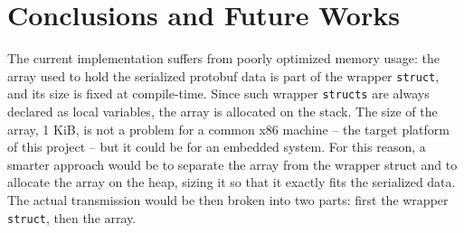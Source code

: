 \section{Conclusions and Future Works}

The current implementation suffers from poorly optimized memory usage: the array used to hold the serialized protobuf data is part of the wrapper \texttt{struct}, and its size is fixed at compile-time. Since such wrapper \texttt{structs} are always declared as local variables, the array is allocated on the stack. The size of the array, 1 KiB, is not a problem for a common x86 machine -- the target platform of this project -- but it could be for an embedded system. For this reason, a smarter approach would be to separate the array from the wrapper struct and to allocate the array on the heap, sizing it so that it exactly fits the serialized data. The actual transmission would be then broken into two parts: first the wrapper \texttt{struct}, then the array.
